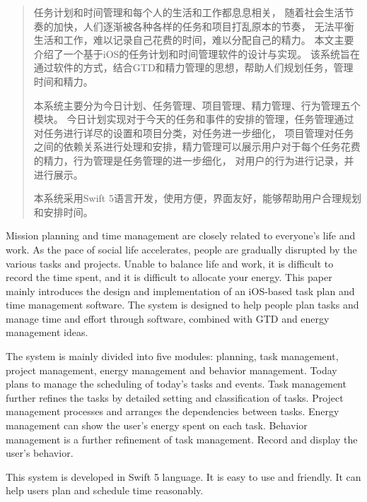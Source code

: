 
\begin{abstract}

任务计划和时间管理和每个人的生活和工作都息息相关，
随着社会生活节奏的加快，人们逐渐被各种各样的任务和项目打乱原本的节奏，
无法平衡生活和工作，难以记录自己花费的时间，难以分配自己的精力。
本文主要介绍了一个基于iOS的任务计划和时间管理软件的设计与实现。
该系统旨在通过软件的方式，结合GTD和精力管理的思想，帮助人们规划任务，管理时间和精力。

本系统主要分为今日计划、任务管理、项目管理、精力管理、行为管理五个模块。
今日计划实现对于今天的任务和事件的安排的管理，任务管理通过对任务进行详尽的设置和项目分类，对任务进一步细化，
项目管理对任务之间的依赖关系进行处理和安排，精力管理可以展示用户对于每个任务花费的精力，行为管理是任务管理的进一步细化，
对用户的行为进行记录，并进行展示。

本系统采用Swift 5语言开发，使用方便，界面友好，能够帮助用户合理规划和安排时间。


\end{abstract}

\begin{englishabstract}

Mission planning and time management are closely related to everyone’s life and work.
As the pace of social life accelerates, people are gradually disrupted by the various tasks and projects.
Unable to balance life and work, it is difficult to record the time spent, and it is difficult to allocate your energy.
This paper mainly introduces the design and implementation of an iOS-based task plan and time management software.
The system is designed to help people plan tasks and manage time and effort through software, combined with GTD and energy management ideas.

The system is mainly divided into five modules: planning, task management, project management, energy management and behavior management.
Today plans to manage the scheduling of today's tasks and events. Task management further refines the tasks by detailed setting and classification of tasks.
Project management processes and arranges the dependencies between tasks. Energy management can show the user's energy spent on each task. Behavior management is a further refinement of task management.
Record and display the user's behavior.

This system is developed in Swift 5 language. It is easy to use and friendly. It can help users plan and schedule time reasonably.

\end{englishabstract}

